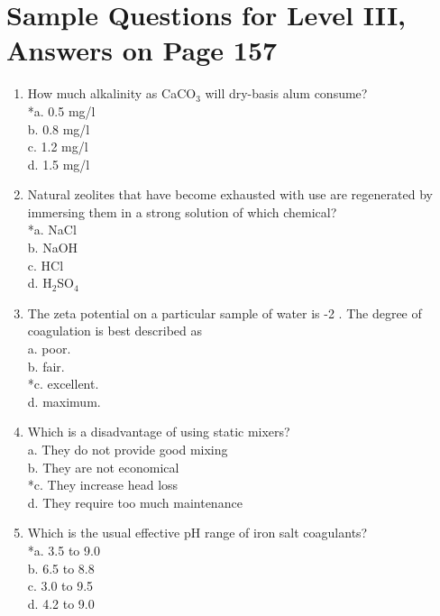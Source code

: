 \section{Sample Questions for Level III, Answers on Page 157}
\begin{enumerate}[label=TIII-\arabic*]
  \item How much alkalinity as CaCO$_{3}$ will dry-basis alum consume?\\
*a. 0.5 mg/l\\
b. 0.8 mg/l\\
c. 1.2 mg/l\\
d. 1.5 mg/l\\
  \item Natural zeolites that have become exhausted with use are regenerated by immersing them in a strong solution of which chemical?\\
*a. NaCl\\
b. NaOH\\
c. HCl\\
d. H$_2$SO$_4$ \\
\item The zeta potential on a particular sample of water is -2 . The degree of coagulation is best described as\\
a. poor.\\
b. fair.\\
*c. excellent.\\
d. maximum.\\
  \item Which is a disadvantage of using static mixers?\\
a. They do not provide good mixing\\
b. They are not economical\\
*c. They increase head loss\\
d. They require too much maintenance\\
  \item Which is the usual effective pH range of iron salt coagulants?\\
*a. 3.5 to 9.0\\
b. 6.5 to 8.8\\
c. 3.0 to 9.5\\
d. 4.2 to 9.0\\
\end{enumerate}
